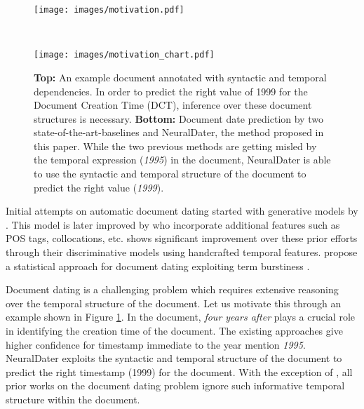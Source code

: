 \documentclass[11pt,a4paper]{article}
\newcommand{\reffig}[1]{Figure \ref{#1}}
\newcommand{\refsec}[1]{Section \ref{#1}}
\newcommand{\method}{NeuralDater}
\begin{document}
\begin{figure}[t]
\begin{minipage}{1in}
\texttt{[image: images/motivation.pdf]}
	\end{minipage} \\
	\begin{minipage}{1in}
		\texttt{[image: images/motivation\_chart.pdf]}
	\end{minipage}
	\caption{\label{fig:motivation}\textbf{Top:} An example document annotated with syntactic and temporal dependencies. In order to predict the right value of 1999 for the Document Creation Time (DCT), inference over these document structures is necessary. \textbf{Bottom:} Document date prediction by two state-of-the-art-baselines and \method{}, the method proposed in this paper. While the two previous methods are getting misled by the temporal expression (\textit{1995}) in the document, \method{} is able to use the syntactic and temporal structure of the document to predict the right value (\textit{1999}). }
\end{figure}

\begin{figure*}[!t]
	\centering
	\caption{\label{fig:overview}Overview of \method{}. \method{} exploits syntactic and temporal structure in a document to learn effective representation, which in turn are used to predict the  document time. \method{} uses a Bi-directional LSTM (Bi-LSTM), two Graph Convolution Networks (GCN) -- one over the dependency tree and the other over the document's temporal graph -- along with a softmax classifier, all trained end-to-end jointly. Please see \refsec{sec:method} for more details.}	
\end{figure*}

Initial attempts on automatic document dating started with generative models by \cite{de_jong05}. This model is
later improved by \cite{Kanhabua:2008:ITL:1429852.1429902} who incorporate additional features such as POS tags, collocations, etc. \citet{Chambers:2012:LDT:2390524.2390539} shows significant improvement over these prior efforts through their discriminative models using handcrafted temporal features. \citet{Kotsakos:2014:BAD:2600428.2609495} propose a statistical approach for document dating exploiting term burstiness \cite{Lappas:2009:BSD:1557019.1557075}. 


Document dating is a challenging problem which requires extensive reasoning over the temporal structure of the document. Let us motivate this through an example shown in \reffig{fig:motivation}. In the document, \textit{four years after} plays a crucial role in identifying the creation time of the document. The existing approaches give higher confidence for timestamp immediate to the year mention \textit{1995}. \method{} exploits the syntactic and temporal structure of the document to predict the right timestamp (1999) for the document. With the exception of \cite{Chambers:2012:LDT:2390524.2390539}, all prior works on the document dating problem ignore such informative temporal structure within the document.
\end{document}
